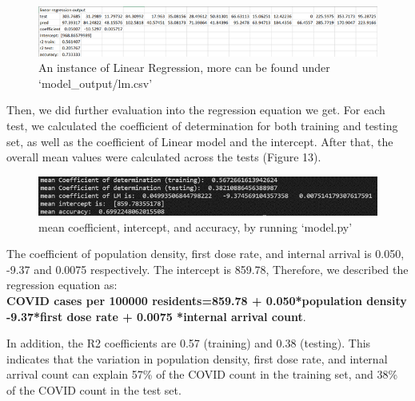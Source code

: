 \documentclass[a4, 11pt]{article}
\begin{document}
\begin{figure}[ht]
    \centering
    \includegraphics[width=1\textwidth]{captures for report/Linear Regression instance.png}
    \caption{An instance of Linear Regression, more can be found under ‘model\_output/lm.csv’ }
    \label{fig:my_label}
\end{figure}

Then, we did further evaluation into the regression equation we get. For each test, we calculated the coefficient of determination for both training and testing set, as well as the coefficient of Linear model and the intercept. After that, the overall mean values were calculated across the  tests (Figure 13).
\begin{figure}[ht]
    \centering
    \includegraphics[width=1\textwidth]{captures for report/mean coefficient, intercept, accuracy.png}
    \caption{mean coefficient, intercept, and accuracy, by running ‘model.py’}
    \label{fig:my_label}
\end{figure}
 The coefficient of population density, first dose rate, and internal arrival is 0.050, -9.37 and 0.0075 respectively. The intercept is 859.78, Therefore, we described the regression equation as:
\\
\textbf{COVID cases per 100000 residents=859.78 + 0.050*population density -9.37*first dose rate + 0.0075 *internal arrival count}.

In addition, the R2 coefficients are 0.57 (training) and 0.38 (testing). This indicates that the variation in population density, first dose rate, and internal arrival count can explain 57\% of the COVID count in the training set, and 38\% of the COVID count in the test set.
\end{document}
